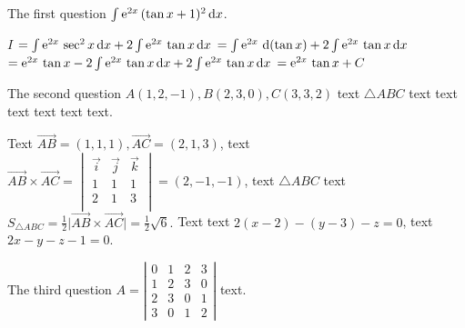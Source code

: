 \documentclass[12pt,most]{randexam}
\begin{document}
\bigskip

\newpage


\begin{question}
The first question $\int\mathrm{e}^{2x}\,(\tan x+1)^2\mathop{}\!\mathrm{d} x$.
\end{question}

\smallskip

\begin{solution}
$I$ \? $=\int\mathrm{e}^{2x}\,\sec^2 x\mathop{}\!\mathrm{d} x+2\int\mathrm{e}^{2x}\,\tan x\mathop{}\!\mathrm{d} x$ 
\+ $=\int\e^{2x}\,\d(\tan x)+ 2\int\e^{2x}\,\tan x\dx$ 
\+ $=\mathrm{e}^{2x}\,\tan x - 2\int\mathrm{e}^{2x}\,\tan x\mathop{}\!\mathrm{d} x+ 2\int\mathrm{e}^{2x}\,\tan x\mathop{}\!\mathrm{d} x$ 
\+ $=\mathrm{e}^{2x}\,\tan x + C$ 
\end{solution}

\vfill

\begin{question}
The second question $A(1,2,-1), B(2,3,0),C(3,3,2)$ text $\triangle ABC$ text text text text text text.
\end{question}

\smallskip

\begin{solution}
Text $\overrightarrow{AB}=(1,1,1),\overrightarrow{AC}=(2,1,3)$, 
text $\overrightarrow{AB}\times \overrightarrow{AC}=\begin{vmatrix}
\vec{i}&\vec{j} &\vec{k}\\
1&1&1\\
2&1&3\\
\end{vmatrix}=(2,-1,-1)$, 
text $\triangle ABC$ text $S_{\triangle ABC}=\frac{1}{2}\big|\overrightarrow{AB}\times
\overrightarrow{AC}\big|=\frac{1}{2}\sqrt{6}.$ 
Text text $2(x-2)-(y-3)-z=0$, text $2x-y-z-1=0$. 
\end{solution}

\vfill

\newpage

\begin{question}
The third question $A = \left|\begin{array}{cccc}
  0 & 1 & 2 & 3\\
  1 & 2 & 3 & 0\\
  2 & 3 & 0 & 1\\
  3 & 0 & 1 & 2
\end{array}\right|$ text.
\end{question}
\end{document}

